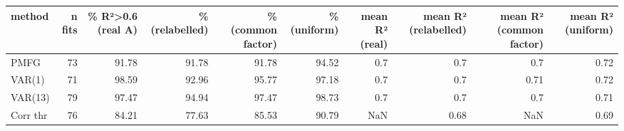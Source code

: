 \begin{tabular}{lrrrrrrrrr}
\toprule
method & n fits & \% R²>0.6 (real A) & \% (relabelled) & \% (common factor) & \% (uniform) & mean R² (real) & mean R² (relabelled) & mean R² (common factor) & mean R² (uniform) \\
\midrule
PMFG & 73 & 91.78 & 91.78 & 91.78 & 94.52 & 0.7 & 0.7 & 0.7 & 0.72 \\
VAR(1) & 71 & 98.59 & 92.96 & 95.77 & 97.18 & 0.7 & 0.7 & 0.71 & 0.72 \\
VAR(13) & 79 & 97.47 & 94.94 & 97.47 & 98.73 & 0.7 & 0.7 & 0.7 & 0.71 \\
Corr thr & 76 & 84.21 & 77.63 & 85.53 & 90.79 & NaN & 0.68 & NaN & 0.69 \\
\bottomrule
\end{tabular}

